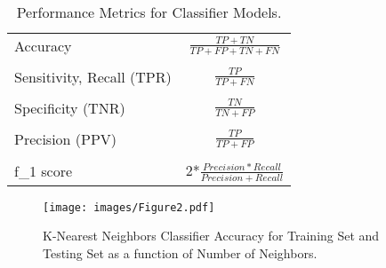 \documentclass[sigconf]{acmart}
\begin{document}

\begin{table}
  \caption{Performance Metrics for Classifier Models.}
  \label{tab:freq}
  \begin{tabular}{lc}
    \toprule
    Accuracy & \(\frac{TP+TN}{TP+FP+TN+FN}\) \\
    & \\
    Sensitivity, Recall (TPR) &  \(\frac{TP}{TP+FN}\) \\
    & \\
    Specificity (TNR) &  \(\frac{TN}{TN+FP}\) \\
    & \\
    Precision (PPV) & \(\frac{TP}{TP+FP}\)  \\
    & \\
    f_1 score & 2*\(\frac{Precision*Recall}{Precision+Recall}\) 
    & \\
    \bottomrule
  \end{tabular}
\end{table}


\begin{figure}[!ht]
  \centering\texttt{[image: images/Figure2.pdf]}
  \caption{K-Nearest Neighbors Classifier Accuracy for Training Set and 
  Testing Set as a function of Number of Neighbors.}
  \label{f:Figure2}
\end{figure}

\end{document}
